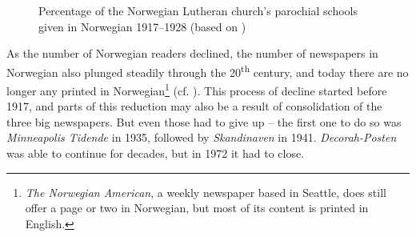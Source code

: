\documentclass[output=paper]{langscibook}
\begin{document}
\begin{figure}
\caption{Percentage of the Norwegian Lutheran church's parochial schools given in Norwegian 1917--1928 (based on \citealt[262]{Haugen1953})}
\label{tab:hjelde:7} 
\end{figure}

As the number of Norwegian readers declined, the number of newspapers in Norwegian also plunged steadily through the 20\textsuperscript{th} century, and today there are no longer any printed in Norwegian\footnote{\textit{The Norwegian American}, a weekly newspaper based in Seattle, does still offer a page or two in Norwegian, but most of its content is printed in English.} (cf. ). This process of decline started before 1917, and parts of this reduction may also be a result of consolidation of the three big newspapers. But even those had to give up – the first one to do so was \textit{Minneapolis Tidende} in 1935, followed by \textit{Skandinaven} in 1941. \textit{Decorah-Posten} was able to continue for decades, but in 1972 it had to close.
\end{document}
